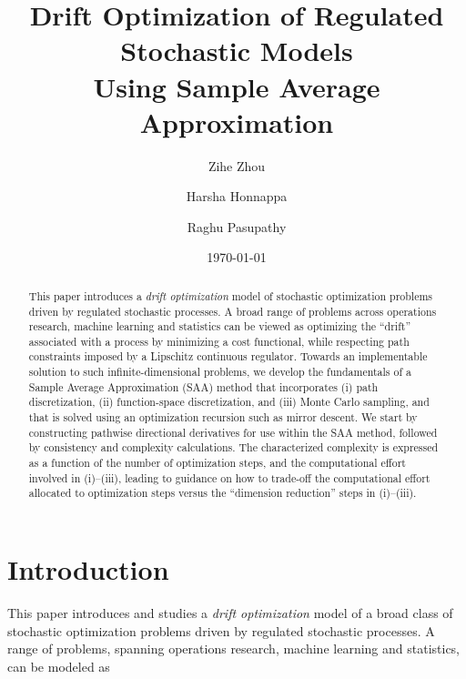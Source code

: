 \documentclass[11pt,leqno]{amsart}
\begin{document}
\title[Drift Optimization of Stochastic Models]{Drift Optimization of Regulated Stochastic Models\\Using Sample Average Approximation}
\author[Z.Zhou]{Zihe Zhou}
\author[H.Honnappa]{Harsha Honnappa}
\author[R.Pasupathy]{Raghu Pasupathy}

\date{\today}
\address{315 N Grant St, West Lafayette, IN 47907-2023, United States}
\maketitle

\let\thefootnote\relax
{} %

\begin{abstract}
This paper introduces a {\it drift optimization} model of stochastic optimization problems driven by regulated stochastic processes. A broad range of problems across operations research, machine learning and statistics can be viewed as optimizing the ``drift'' associated with a process by minimizing a cost functional, while respecting path constraints imposed by a Lipschitz continuous regulator. Towards an implementable solution to such infinite-dimensional problems, we develop the fundamentals of a Sample Average Approximation (SAA) method that incorporates (i) path discretization, (ii) function-space discretization, and (iii) Monte Carlo sampling, and that is solved using an optimization recursion such as mirror descent. We start by constructing pathwise directional derivatives for use within the SAA method, followed by consistency and complexity calculations. The characterized complexity is expressed as a function of the number of optimization steps, and the computational effort involved in (i)--(iii), leading to guidance on how to trade-off the computational effort allocated to optimization steps versus the ``dimension reduction'' steps in (i)--(iii).
\end{abstract} %

\bigskip

\section{Introduction}\label{sec:Intro}
This paper introduces and studies a {\it drift optimization} model of a broad class of stochastic optimization problems driven by regulated stochastic processes. 
A range of problems, spanning operations research, machine learning and statistics, can be modeled as
\end{document}
